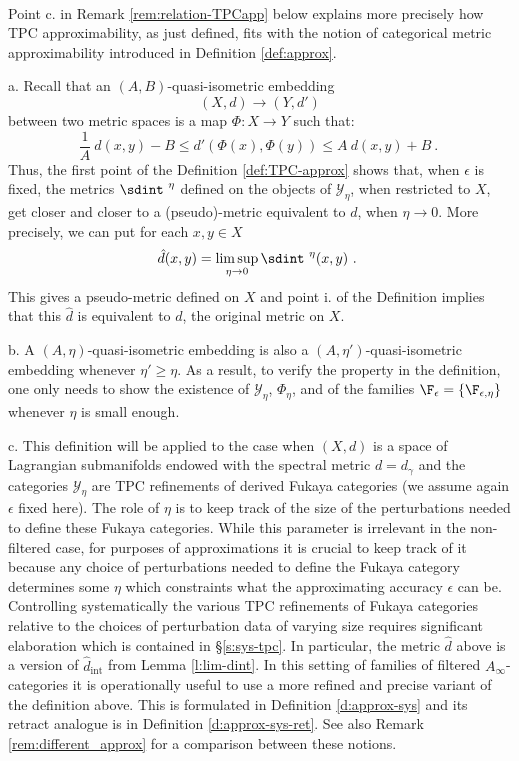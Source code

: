 \

Point c. in Remark \ref{rem:relation-TPCapp} below explains more precisely how  TPC  approximability, as just defined, fits with the notion of categorical metric approximability introduced in Definition \ref{def:approx}.


\begin{rem}\label{rem:def-TPC-approx}
  a. Recall that an $(A,B)$-quasi-isometric embedding
  $$(X,d) \to (Y,d')$$ between two metric spaces is a
  map $\Phi : X\to Y$ such that:
  $$\frac{1}{A}\  d(x,y)-B \leq d'(\Phi(x),\Phi(y))\leq A\ d(x,y)+B~.~$$
  Thus, the first point of the Definition \ref{def:TPC-approx} shows that, when $\epsilon$ is
  fixed, the metrics
  $\sdint^{\ \eta}$ defined on the objects of $\mathscr{Y}_{\eta}$, when
  restricted to $X$, get closer and closer to a (pseudo)-metric
  equivalent to $d$, when $\eta\to 0$. More precisely, we can put for
  each $x,y\in X$
  $$\hat{d}(x,y)=\limsup_{\eta\to 0} \sdint^{\ \eta} (x,y)~.~$$
  This gives a pseudo-metric defined on $X$ and point i. of the
  Definition implies that this $\hat{d}$ is equivalent to $d$, the
  original metric on $X$.

  b. A $(A,\eta)$-quasi-isometric embedding is also a
  $(A,\eta')$-quasi-isometric embedding whenever $\eta'\geq \eta$. As
  a result, to verify the property in the definition, one only needs
  to show the existence of $\mathscr{Y}_{\eta}$, $\Phi_{\eta}$, and of
  the families $\F_{\epsilon} =\{\F_{\epsilon,\eta}\}$ whenever $\eta$ is small enough.

  c. This definition will be applied to the case when $(X,d)$ is a
  space of Lagrangian submanifolds endowed with the spectral metric
  $d=d_{\gamma}$ and the categories $\mathscr{Y}_{\eta}$ are TPC
  refinements of derived Fukaya categories (we assume again $\epsilon$ fixed here). 
  The role of $\eta$ is to
  keep track of the size of the perturbations needed to define these
  Fukaya categories. While this parameter is irrelevant in the
  non-filtered case, for purposes of approximations it is crucial to
  keep track of it because any choice of perturbations needed to
  define the Fukaya category determines some $\eta$ which constraints what the approximating accuracy $\epsilon$ can be. Controlling systematically the various TPC refinements of  Fukaya categories  relative to the choices of perturbation data of varying size requires significant elaboration which is contained in \S\ref{s:sys-tpc}. In particular, the metric $\hat{d}$ above is a version  of $\widehat{d}_{\mathrm{int}}$ from Lemma \ref{l:lim-dint}. In this setting of families of filtered $A_{\infty}$-categories it is operationally useful to use a more refined and precise variant of the definition above. This is formulated  in Definition \ref{d:approx-sys} and its retract analogue is  in Definition \ref{d:approx-sys-ret}. See also Remark \ref{rem:different_approx} for a comparison between these notions.
  

\end{rem}
